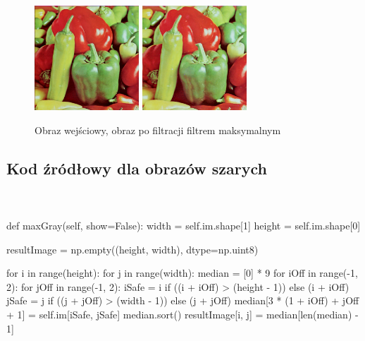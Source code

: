 \documentclass[final,a4paper,openany,12pt]{mwbk}
\begin{document}
\begin{figure}[H]
	\begin{center}
		\includegraphics[width=0.35\textwidth]{peppers_color}
		\includegraphics[width=0.35\textwidth]{peppers_color_max_result}
	\end{center}
	\caption{Obraz wejściowy, obraz po filtracji filtrem maksymalnym}
\end{figure}

\newpage

\subsection*{Kod źródłowy dla obrazów szarych}
\hfill
\\\\
\noindent def maxGray(self, show=False): \newline
\indent width = self.im.shape[1] \newline
\indent height = self.im.shape[0] \newline

resultImage = np.empty((height, width), dtype=np.uint8) \newline

for i in range(height): \newline
\indent for j in range(width): \newline
\indent median = [0] * 9 \newline
\indent for iOff in range(-1, 2): \newline
\indent for jOff in range(-1, 2): \newline
\indent iSafe = i if ((i + iOff) > (height - 1)) else (i + iOff) \newline
\indent jSafe = j if ((j + jOff) > (width - 1)) else (j + jOff) \newline
\indent median[3 * (1 + iOff) + jOff + 1] = self.im[iSafe, jSafe] \newline
\indent median.sort() \newline
\indent resultImage[i, j] = median[len(median) - 1] \newline
\end{document}
